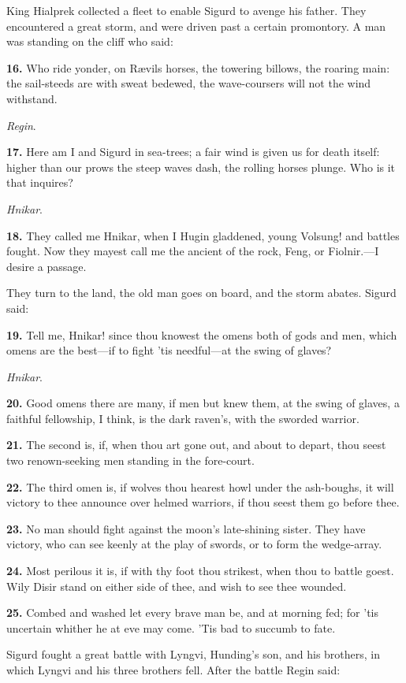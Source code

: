 King Hialprek collected a fleet to enable Sigurd to avenge his father.
They encountered a great storm, and were driven past a certain
promontory. A man was standing on the cliff who said:

\textbf{16.} Who ride yonder, on Rævils horses, the towering billows, the
roaring main: the sail-steeds are with sweat bedewed, the
wave-coursers will not the wind withstand.

\emph{Regin}.

\textbf{17.} Here am I and Sigurd in sea-trees; a fair wind is given us for
death itself: higher than our prows the steep waves dash, the rolling
horses plunge. Who is it that inquires?

\emph{Hnikar}.

\textbf{18.} They called me Hnikar, when I Hugin gladdened, young Volsung!
and battles fought. Now they mayest call me the ancient of the rock,
Feng, or Fiolnir.—I desire a passage.

They turn to the land, the old man goes on board, and the storm
abates. Sigurd said:

\textbf{19.} Tell me, Hnikar! since thou knowest the omens both of gods and
men, which omens are the best—if to fight 'tis needful—at the swing
of glaves?

\emph{Hnikar}.

\textbf{20.} Good omens there are many, if men but knew them, at the swing of
glaves, a faithful fellowship, I think, is the dark raven's, with the
sworded warrior.

\textbf{21.} The second is, if, when thou art gone out, and about to depart,
thou seest two renown-seeking men standing in the fore-court.

\textbf{22.} The third omen is, if wolves thou hearest howl under the
ash-boughs, it will victory to thee announce over helmed warriors, if
thou seest them go before thee.

\textbf{23.} No man should fight against the moon's late-shining sister. They
have victory, who can see keenly at the play of swords, or to form the
wedge-array.

\textbf{24.} Most perilous it is, if with thy foot thou strikest, when thou
to battle goest. Wily Disir stand on either side of thee, and wish to
see thee wounded.

\textbf{25.} Combed and washed let every brave man be, and at morning fed;
for 'tis uncertain whither he at eve may come. 'Tis bad to succumb to
fate.

Sigurd fought a great battle with Lyngvi, Hunding's son, and his
brothers, in which Lyngvi and his three brothers fell. After the
battle Regin said:

